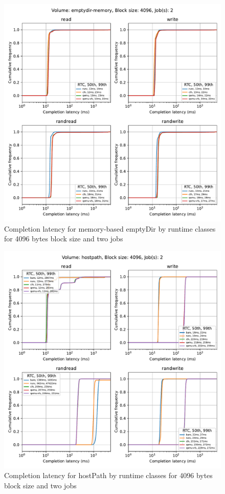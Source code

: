 \begin{figure}[ht]
  \begin{center}
    \includegraphics[width=12cm]{results/subplot_clat_bw_by_rw(emptydir-memory,2,4096).pdf}
    \caption{Completion latency for memory-based emptyDir by runtime classes for 4096 bytes block size and two jobs}
    \label{fig:ResultsEDMEMClatByRTC4096-2}
  \end{center}
\end{figure}

\begin{figure}[ht]
  \begin{center}
    \includegraphics[width=12cm]{results/subplot_clat_bw_by_rw(hostpath,2,4096).pdf}
    \caption{Completion latency for hostPath by runtime classes for 4096 bytes block size and two jobs}
    \label{fig:ResultsHPClatByRTC4096-2}
  \end{center}
\end{figure}

